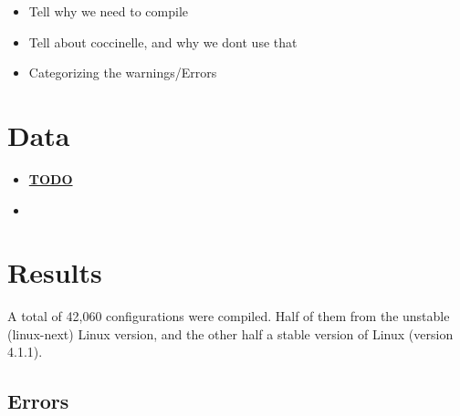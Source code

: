 \documentclass[a4paper,11pt]{report}
\begin{document}
\begin{itemize}
    \item Tell why we need to compile
    \item Tell about coccinelle, and why we dont use that
    \item Categorizing the warnings/Errors
\end{itemize}




\newpage
\chapter{Data}






\begin{itemize}
    \item \underline{\textbf{TODO}}
        \item 
\end{itemize}

\newpage
\chapter{Results}

A total of 42,060 configurations were compiled. Half of them from the unstable 
(linux-next) Linux version, and the other half a stable version of Linux 
(version 4.1.1).

    \section{Errors}
\end{document}
